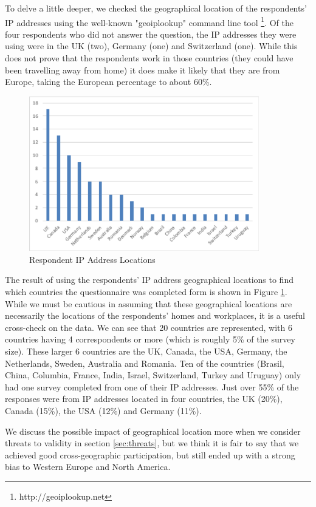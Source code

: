 To delve a little deeper, we checked the geographical location of the respondents' IP addresses using the well-known "geoiplookup" command line tool \footnote{http://geoiplookup.net}.  Of the four respondents who did not answer the question, the IP addresses they were using were in the UK (two), Germany (one) and Switzerland (one).  While this does not prove that the respondents work in those countries (they could have been travelling away from home) it does make it likely that they are from Europe, taking the European percentage to about 60\%.
 
\begin{figure}
\centering
\includegraphics[width=10cm,trim={2 2 2 2},clip]{Figures/prioritisation-iplocation}
\caption{Respondent IP Address Locations}
\label{figure:iplocations}
\end{figure}

The result of using the respondents' IP address geographical locations to find which countries the questionnaire was completed form is shown in Figure \ref{figure:iplocations}.  While we must be cautious in assuming that these geographical locations are necessarily the locations of the respondents' homes and workplaces, it is a useful cross-check on the data.  We can see that 20 countries are represented, with 6 countries having 4 correspondents or more (which is roughly 5\% of the survey size).  These larger 6 countries are the UK, Canada, the USA, Germany, the Netherlands, Sweden, Australia and Romania.  Ten of the countries (Brasil, China, Columbia, France, India, Israel, Switzerland, Turkey and Uruguay) only had one survey completed from one of their IP addresses.  Just over 55\% of the responses were from IP addresses located in four countries, the UK (20\%), Canada (15\%), the USA (12\%) and Germany (11\%).

We discuss the possible impact of geographical location more when we consider threats to validity in section \ref{sec:threats}, but we think it is fair to say that we achieved good cross-geographic participation, but still ended up with a strong bias to Western Europe and North America.

